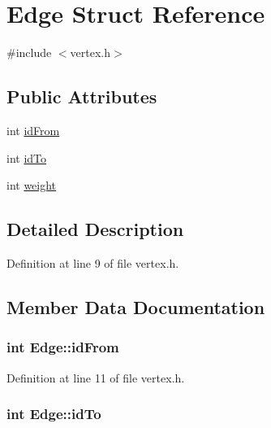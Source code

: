 \hypertarget{struct_edge}{}\section{Edge Struct Reference}
\label{struct_edge}


{\ttfamily \#include $<$vertex.\+h$>$}

\subsection*{Public Attributes}
\begin{DoxyCompactItemize}
\item 
int \hyperlink{struct_edge_ad1319391eee273abf83c98be4780d19e}{id\+From}
\item 
int \hyperlink{struct_edge_aabcf5e86aeb614464438885671124b0d}{id\+To}
\item 
int \hyperlink{struct_edge_a4d58e1f4de38fa55549497175981ebab}{weight}
\end{DoxyCompactItemize}


\subsection{Detailed Description}


Definition at line 9 of file vertex.\+h.



\subsection{Member Data Documentation}
\subsubsection[{\texorpdfstring{id\+From}{idFrom}}]{\setlength{\rightskip}{0pt plus 5cm}int Edge\+::id\+From}\hypertarget{struct_edge_ad1319391eee273abf83c98be4780d19e}{}\label{struct_edge_ad1319391eee273abf83c98be4780d19e}


Definition at line 11 of file vertex.\+h.

\subsubsection[{\texorpdfstring{id\+To}{idTo}}]{\setlength{\rightskip}{0pt plus 5cm}int Edge\+::id\+To}\hypertarget{struct_edge_aabcf5e86aeb614464438885671124b0d}{}\label{struct_edge_aabcf5e86aeb614464438885671124b0d}


